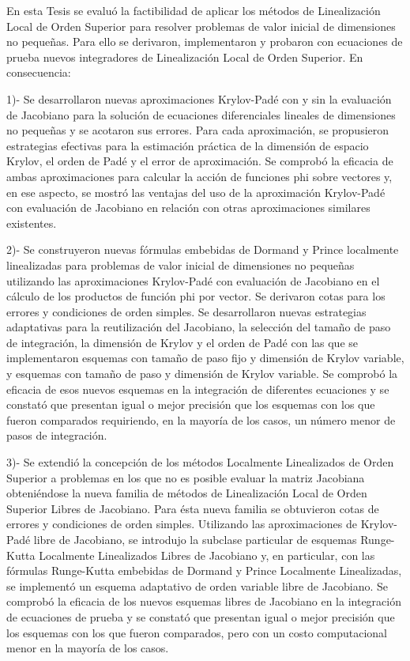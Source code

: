 \begin{conclusions}
	
	En esta Tesis se evaluó la factibilidad de aplicar los métodos de Linealización Local de Orden Superior para resolver problemas de valor inicial de dimensiones no pequeñas. Para ello se derivaron, implementaron y probaron con ecuaciones de prueba nuevos integradores de Linealización Local de Orden Superior. En consecuencia:
	
	1)- Se desarrollaron nuevas aproximaciones Krylov-Padé con y sin la evaluación de Jacobiano para la solución de ecuaciones diferenciales lineales de dimensiones no pequeñas y se acotaron sus errores.
	Para cada aproximación, se propusieron estrategias efectivas para la estimación práctica de la dimensión de espacio Krylov, el orden de Padé y el error de aproximación. Se comprobó la eficacia de
	ambas aproximaciones para calcular la acción de funciones phi sobre vectores y, en ese aspecto, se 	mostró las ventajas del uso de la aproximación Krylov-Padé con evaluación de Jacobiano en relación
	con otras aproximaciones similares existentes.
	
	2)- Se construyeron nuevas fórmulas embebidas de Dormand y Prince localmente linealizadas para problemas de valor inicial de dimensiones no pequeñas utilizando las aproximaciones Krylov-Padé
	con evaluación de Jacobiano en el cálculo de los productos de función phi por vector. Se derivaron cotas para los errores y condiciones de orden simples. Se desarrollaron nuevas estrategias adaptativas para la reutilización del Jacobiano, la selección del tamaño de paso de integración, la dimensión de Krylov
	y el orden de Padé con las que se implementaron esquemas con tamaño de paso fijo y dimensión 	de Krylov variable, y esquemas con tamaño de paso y dimensión de Krylov variable. Se comprobó
	la eficacia de esos nuevos esquemas en la integración de diferentes ecuaciones y se constató que presentan igual o mejor precisión que los esquemas con los que fueron comparados requiriendo, en
	la mayoría de los casos, un número menor de pasos de integración.
	
	3)- Se extendió la concepción de los métodos Localmente Linealizados de Orden Superior a problemas en los que no es posible evaluar la matriz Jacobiana obteniéndose la nueva familia de métodos
	de Linealización Local de Orden Superior Libres de Jacobiano. Para ésta nueva familia se obtuvieron cotas de errores y condiciones de orden simples. Utilizando las aproximaciones de Krylov-Padé libre
	de Jacobiano, se introdujo la subclase particular de esquemas Runge-Kutta Localmente Linealizados Libres de Jacobiano y, en particular, con las fórmulas Runge-Kutta embebidas de Dormand y
	Prince Localmente Linealizadas, se implementó un esquema adaptativo de orden variable libre de Jacobiano. Se comprobó la eficacia de los nuevos esquemas libres de Jacobiano en la integración de
	ecuaciones de prueba y se constató que presentan igual o mejor precisión que los esquemas con los que fueron comparados, pero con un costo computacional menor en la mayoría de los casos.
	

\end{conclusions}

